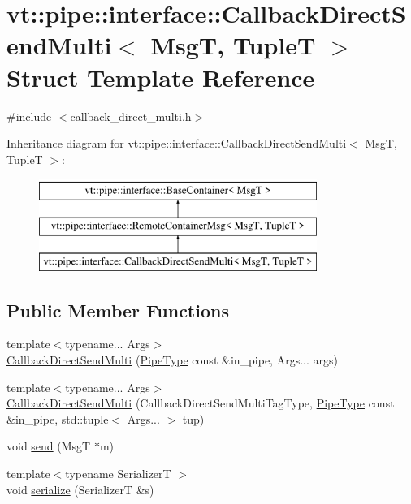 \hypertarget{structvt_1_1pipe_1_1interface_1_1_callback_direct_send_multi}{}\section{vt\+:\+:pipe\+:\+:interface\+:\+:Callback\+Direct\+Send\+Multi$<$ MsgT, TupleT $>$ Struct Template Reference}
\label{structvt_1_1pipe_1_1interface_1_1_callback_direct_send_multi}


{\ttfamily \#include $<$callback\+\_\+direct\+\_\+multi.\+h$>$}

Inheritance diagram for vt\+:\+:pipe\+:\+:interface\+:\+:Callback\+Direct\+Send\+Multi$<$ MsgT, TupleT $>$\+:\begin{figure}[H]
\begin{center}
\leavevmode
\includegraphics[height=3.000000cm]{structvt_1_1pipe_1_1interface_1_1_callback_direct_send_multi}
\end{center}
\end{figure}
\subsection*{Public Member Functions}
\begin{DoxyCompactItemize}
\item 
{\footnotesize template$<$typename... Args$>$ }\\\hyperlink{structvt_1_1pipe_1_1interface_1_1_callback_direct_send_multi_a1cbeaa5af7e41f7fdfd7b704bee7aa4a}{Callback\+Direct\+Send\+Multi} (\hyperlink{namespacevt_ac9852acda74d1896f48f406cd72c7bd3}{Pipe\+Type} const \&in\+\_\+pipe, Args... args)
\item 
{\footnotesize template$<$typename... Args$>$ }\\\hyperlink{structvt_1_1pipe_1_1interface_1_1_callback_direct_send_multi_aac3f53cfde8e3efb90ab1f938f792b39}{Callback\+Direct\+Send\+Multi} (Callback\+Direct\+Send\+Multi\+Tag\+Type, \hyperlink{namespacevt_ac9852acda74d1896f48f406cd72c7bd3}{Pipe\+Type} const \&in\+\_\+pipe, std\+::tuple$<$ Args... $>$ tup)
\item 
void \hyperlink{structvt_1_1pipe_1_1interface_1_1_callback_direct_send_multi_aebfa7640c7157aae642a1a04eeec87b5}{send} (MsgT $\ast$m)
\item 
{\footnotesize template$<$typename SerializerT $>$ }\\void \hyperlink{structvt_1_1pipe_1_1interface_1_1_callback_direct_send_multi_a5834e12c21fa0530d70a4aa0c1b17697}{serialize} (SerializerT \&s)
\end{DoxyCompactItemize}
